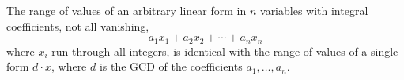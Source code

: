 The range of values of an arbitrary linear form in $n$ variables with integral coefficients, not all vanishing,
$$a_1x_1 + a_2x_2 + \cdots + a_nx_n$$
where $x_i$ run through all integers, is identical with the range of values of a single form $d \cdot x$, where $d$ is the GCD of the coefficients $a_1,\ldots,a_n$.
